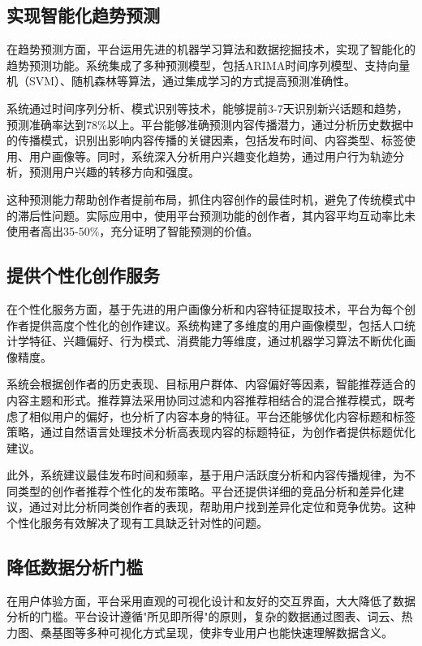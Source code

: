 \documentclass[12pt,a4paper]{article}
\begin{document}
\subsection{实现智能化趋势预测}

在趋势预测方面，平台运用先进的机器学习算法和数据挖掘技术，实现了智能化的趋势预测功能。系统集成了多种预测模型，包括ARIMA时间序列模型、支持向量机（SVM）、随机森林等算法，通过集成学习的方式提高预测准确性。

系统通过时间序列分析、模式识别等技术，能够提前3-7天识别新兴话题和趋势，预测准确率达到78\%以上。平台能够准确预测内容传播潜力，通过分析历史数据中的传播模式，识别出影响内容传播的关键因素，包括发布时间、内容类型、标签使用、用户画像等。同时，系统深入分析用户兴趣变化趋势，通过用户行为轨迹分析，预测用户兴趣的转移方向和强度。

这种预测能力帮助创作者提前布局，抓住内容创作的最佳时机，避免了传统模式中的滞后性问题。实际应用中，使用平台预测功能的创作者，其内容平均互动率比未使用者高出35-50\%，充分证明了智能预测的价值。

\subsection{提供个性化创作服务}

在个性化服务方面，基于先进的用户画像分析和内容特征提取技术，平台为每个创作者提供高度个性化的创作建议。系统构建了多维度的用户画像模型，包括人口统计学特征、兴趣偏好、行为模式、消费能力等维度，通过机器学习算法不断优化画像精度。

系统会根据创作者的历史表现、目标用户群体、内容偏好等因素，智能推荐适合的内容主题和形式。推荐算法采用协同过滤和内容推荐相结合的混合推荐模式，既考虑了相似用户的偏好，也分析了内容本身的特征\cite{content-recommendation}。平台还能够优化内容标题和标签策略，通过自然语言处理技术分析高表现内容的标题特征，为创作者提供标题优化建议。

此外，系统建议最佳发布时间和频率，基于用户活跃度分析和内容传播规律，为不同类型的创作者推荐个性化的发布策略。平台还提供详细的竞品分析和差异化建议，通过对比分析同类创作者的表现，帮助用户找到差异化定位和竞争优势。这种个性化服务有效解决了现有工具缺乏针对性的问题。

\subsection{降低数据分析门槛}

在用户体验方面，平台采用直观的可视化设计和友好的交互界面，大大降低了数据分析的门槛。平台设计遵循"所见即所得"的原则，复杂的数据通过图表、词云、热力图、桑基图等多种可视化方式呈现，使非专业用户也能快速理解数据含义。
\end{document}
